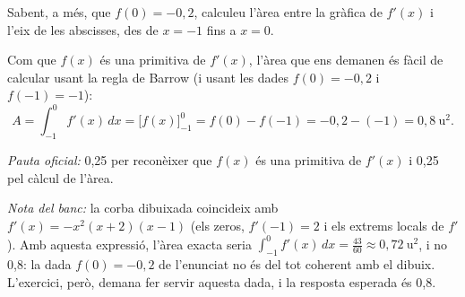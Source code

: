 \begin{apartats}
Sabent, a més, que $f(0)=-0{,}2$, calculeu l'àrea entre la gràfica de $f'(x)$ i l'eix de les abscisses, des
de $x=-1$ fins a $x=0$.

\begin{solucio}
Com que $f(x)$ és una primitiva de $f'(x)$, l'àrea que ens demanen és fàcil de calcular usant la regla de
Barrow (i usant les dades $f(0)=-0{,}2$ i $f(-1)=-1$):
\[
A=\int_{-1}^{0}f'(x)\,dx=\bigl[f(x)\bigr]_{-1}^{0}=f(0)-f(-1)=-0{,}2-(-1)=0{,}8\ \text{u}^2 .
\]

\textit{Pauta oficial:} 0,25 per reconèixer que $f(x)$ és una primitiva de $f'(x)$ i 0,25 pel càlcul de
l'àrea.

\textit{Nota del banc:} la corba dibuixada coincideix amb $f'(x)=-x^2(x+2)(x-1)$ (els zeros, $f'(-1)=2$ i
els extrems locals de $f'$). Amb aquesta expressió, l'àrea exacta seria $\int_{-1}^{0}f'(x)\,dx=\frac{43}{60}
\approx0{,}72\ \text{u}^2$, i no 0,8: la dada $f(0)=-0{,}2$ de l'enunciat no és del tot coherent amb el dibuix.
L'exercici, però, demana fer servir aquesta dada, i la resposta esperada és 0,8.
\end{solucio}

\end{apartats}
